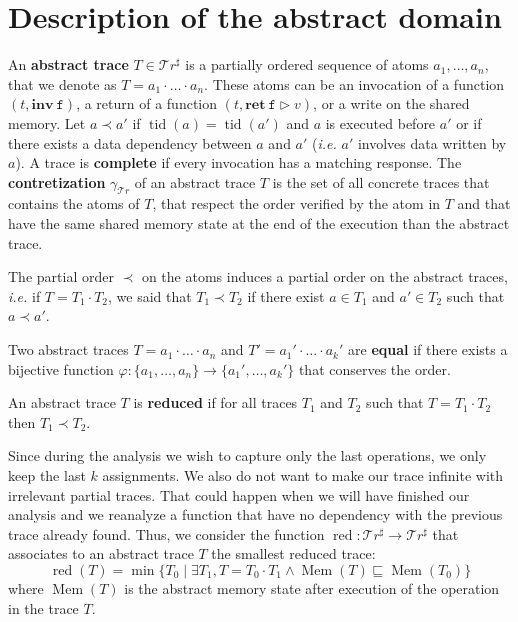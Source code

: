 \documentclass[runningheads]{llncs}
\newcommand{\inv}[1]{\mathbf{inv}\ \mathtt{#1}}
\newcommand{\ret}[2]{\mathbf{ret}\ \mathtt{#1} \vartriangleright #2}
\newcommand{\Traces}{\mathcal T\!r}
\newcommand{\aTraces}{\mathcal T\!r^\sharp}
\DeclareMathOperator{\tid}{tid}
\DeclareMathOperator{\red}{red}
\DeclareMathOperator{\Mem}{Mem}
\begin{document}
\section{Description of the abstract domain}
\label{sec:absDom}

\begin{definition}
	An \textbf{abstract trace} $T \in \aTraces$ is a partially ordered sequence of atoms $a_1, \dots, a_n$, that we denote as $T = a_1 \cdot \ldots \cdot a_n$. These atoms can be an invocation of a function $(t, \inv{f})$, a return of a function $(t, \ret{f}{v})$, or a write on the shared memory. Let $a \prec a'$ if $\tid(a) = \tid(a')$ and $a$ is executed before $a'$ or if there exists a data dependency between $a$ and $a'$ (\emph{i.e.} $a'$ involves data written by $a$). A trace is \textbf{complete} if every invocation has a matching response. The \textbf{contretization} $\gamma_{\Traces}$ of an abstract trace $T$ is the set of all concrete traces that contains the atoms of $T$, that respect the order verified by the atom in $T$ and that have the same shared memory state at the end of the execution than the abstract trace.
\end{definition}

The partial order $\prec$ on the atoms induces a partial order on the abstract traces, \textit{i.e.} if $T = T_1 \cdot T_2$, we said that $T_1 \prec T_2$ if there exist $a\in T_1$ and $a' \in T_2$ such that $a\prec a'$. 


\begin{definition}
		Two abstract traces $T = a_1 \cdot \ldots \cdot a_n$ and $T' = a_1' \cdot \ldots \cdot a_k'$ are \textbf{equal} if there exists a bijective function $\varphi : \{a_1,\dots,a_n\} \rightarrow \{a_1',\dots, a_k'\}$ that conserves the order. 
\end{definition}

\begin{definition}
	An abstract trace $T$ is \textbf{reduced} if for all traces $T_1$ and $T_2$ such that $T=T_1\cdot T_2$ then $T_1 \prec T_2$. 
\end{definition}



Since during the analysis we wish to capture only the last operations, we only keep the last $k$ assignments. We also do not want to make our trace infinite with irrelevant partial traces. That could happen when we will have finished our analysis and we reanalyze a function that have no dependency with the previous trace already found. Thus, we consider the function $\red : \aTraces \rightarrow \aTraces$ that associates to an abstract trace $T$ the smallest reduced trace:
\begin{equation} \label{eq:red}
	\red(T) = \min \{T_0 \mid \exists T_1, T = T_0 \cdot T_1 \wedge \Mem(T) \sqsubseteq \Mem(T_0)\}
\end{equation}%
where $\Mem(T)$ is the abstract memory state after execution of the operation in the trace $T$. 
\end{document}
